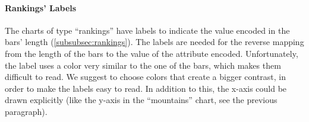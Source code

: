 \paragraph{Rankings' Labels}
The charts of type ``rankings'' have labels to indicate the value encoded in the bars' length (\cref{subsubsec:rankings}).
The labels are needed for the reverse mapping from the length of the bars to the value of the attribute encoded.
Unfortunately, the label uses a color very similar to the one of the bars, which makes them difficult to read.
We suggest to choose colors that create a bigger contrast, in order to make the labels easy to read.
In addition to this, the x-axis could be drawn explicitly (like the y-axis in the ``mountains'' chart, see the previous paragraph).
